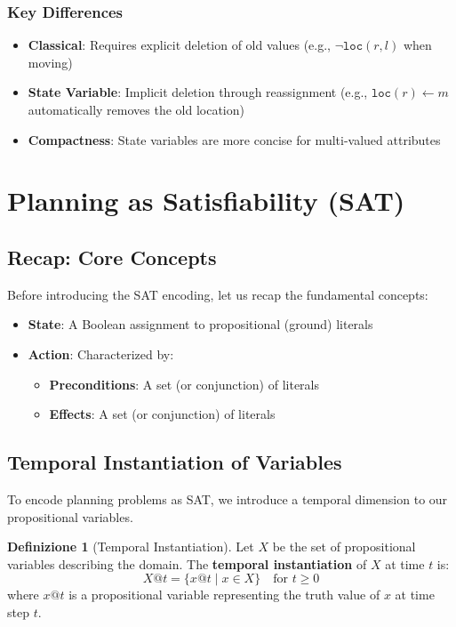 \documentclass[11pt,a4paper]{article}
\theoremstyle{definition}
\newtheorem{definition}{Definizione}[section]
\theoremstyle{plain}
\theoremstyle{remark}
\begin{document}
\subsubsection{Key Differences}

\begin{itemize}
    \item \textbf{Classical}: Requires explicit deletion of old values (e.g., $\neg \texttt{loc}(r, l)$ when moving)
    \item \textbf{State Variable}: Implicit deletion through reassignment (e.g., $\texttt{loc}(r) \leftarrow m$ automatically removes the old location)
    \item \textbf{Compactness}: State variables are more concise for multi-valued attributes
\end{itemize}

\section{Planning as Satisfiability (SAT)}

\subsection{Recap: Core Concepts}

Before introducing the SAT encoding, let us recap the fundamental concepts:

\begin{itemize}
    \item \textbf{State}: A Boolean assignment to propositional (ground) literals
    \item \textbf{Action}: Characterized by:
    \begin{itemize}
        \item \textbf{Preconditions}: A set (or conjunction) of literals
        \item \textbf{Effects}: A set (or conjunction) of literals
    \end{itemize}
\end{itemize}

\subsection{Temporal Instantiation of Variables}

To encode planning problems as SAT, we introduce a temporal dimension to our propositional variables.

\begin{definition}[Temporal Instantiation]
Let $X$ be the set of propositional variables describing the domain. The \textbf{temporal instantiation} of $X$ at time $t$ is:
\[
X@t = \{x@t \mid x \in X\} \quad \text{for } t \geq 0
\]
where $x@t$ is a propositional variable representing the truth value of $x$ at time step $t$.
\end{definition}
\end{document}
